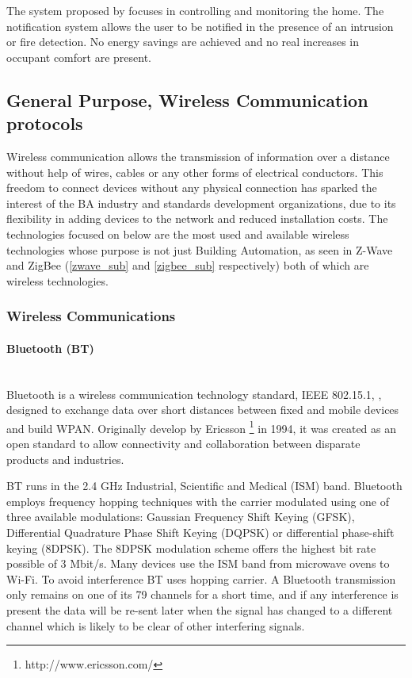 The system proposed by \cite{academic3} focuses in controlling and monitoring the home. The notification system allows the user to be notified in the presence of an intrusion or fire detection.
No energy savings are achieved and no real increases in occupant comfort are present.



\subsection{General Purpose, Wireless Communication protocols} \label{ssec:num2}

Wireless communication allows the transmission of information over a distance without help of wires, cables or any other forms of electrical conductors. This freedom to connect devices without any physical connection has sparked the interest of the BA industry and standards development organizations, due to its flexibility in adding devices to the network and reduced installation costs. 
The technologies focused on below are the most used and available wireless technologies whose purpose is not just Building Automation, as seen in Z-Wave and ZigBee (\ref{zwave_sub} and \ref{zigbee_sub} respectively) both of which are wireless technologies. 


\subsubsection{Wireless Communications}

\paragraph{Bluetooth (BT)}\mbox{}\\

Bluetooth is a wireless communication technology standard, IEEE 802.15.1, \cite{std_802.15.1,comunication:bt,comunication:bt_specification}, designed to exchange data over short distances between fixed and mobile devices and build WPAN. Originally develop by Ericsson \footnote{http://www.ericsson.com/} in 1994, it was created as an open standard to allow connectivity and collaboration between disparate products and industries.

BT runs in the 2.4 GHz Industrial, Scientific and Medical (ISM) band. Bluetooth employs frequency hopping techniques with the carrier modulated using one of three available modulations: Gaussian Frequency Shift Keying (GFSK), Differential Quadrature Phase Shift Keying (DQPSK) or differential phase-shift keying (8DPSK). The 8DPSK modulation scheme offers the highest bit rate possible of 3  Mbit/s. Many devices use the ISM band from microwave ovens to Wi-Fi. To avoid interference BT uses hopping carrier. A Bluetooth transmission only remains on one of its 79 channels for a short time, and if any interference is present the data will be re-sent later when the signal has changed to a different channel which is likely to be clear of other interfering signals.

